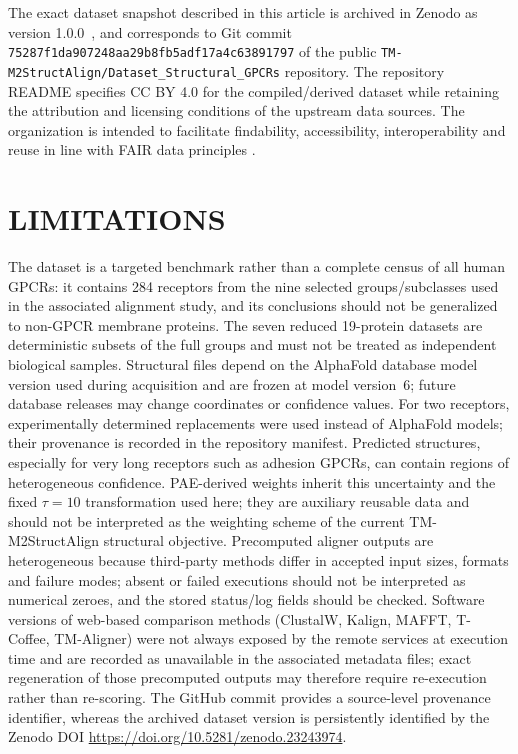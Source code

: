 \documentclass[a4paper,12pt]{article}
\begin{document}
	The exact dataset snapshot described in this article is archived in Zenodo as version 1.0.0~\cite{zambrano2026gpcrdataset}, and corresponds to Git commit \texttt{75287f1da907248aa29b8fb5adf17a4c63891797} of the public
	\texttt{TM-M2StructAlign/Dataset\_Structural\_GPCRs} repository.
	The repository README specifies CC BY 4.0 for the compiled/derived dataset while retaining the attribution and licensing conditions of the upstream data sources. The organization is intended to facilitate findability, accessibility, interoperability and reuse in line with FAIR data principles \cite{wilkinson2016fair}.
	
	\section*{LIMITATIONS}
	The dataset is a targeted benchmark rather than a complete census of all human GPCRs: it contains 284 receptors from the nine selected groups/subclasses used in the associated alignment study, and its conclusions should not be generalized to non-GPCR membrane proteins. The seven reduced 19-protein datasets are deterministic subsets of the full groups and must not be treated as independent biological samples. Structural files depend on the AlphaFold database model version used during acquisition and are frozen at model version~6; future database releases may change coordinates or confidence values. For two receptors, experimentally determined replacements were used instead of AlphaFold models; their provenance is recorded in the repository manifest. Predicted structures, especially for very long receptors such as adhesion GPCRs, can contain regions of heterogeneous confidence. PAE-derived weights inherit this uncertainty and the fixed $\tau=10$ transformation used here; they are auxiliary reusable data and should not be interpreted as the weighting scheme of the current TM-M2StructAlign structural objective. Precomputed aligner outputs are heterogeneous because third-party methods differ in accepted input sizes, formats and failure modes; absent or failed executions should not be interpreted as numerical zeroes, and the stored status/log fields should be checked. Software versions of web-based comparison methods (ClustalW, Kalign, MAFFT, T-Coffee, TM-Aligner) were not always exposed by the remote services at execution time and are recorded as unavailable in the associated metadata files; exact regeneration of those precomputed outputs may therefore require re-execution rather than re-scoring. The GitHub commit provides a source-level provenance identifier, whereas the archived dataset version is persistently identified by the Zenodo DOI \url{https://doi.org/10.5281/zenodo.23243974}.
	
\end{document}
